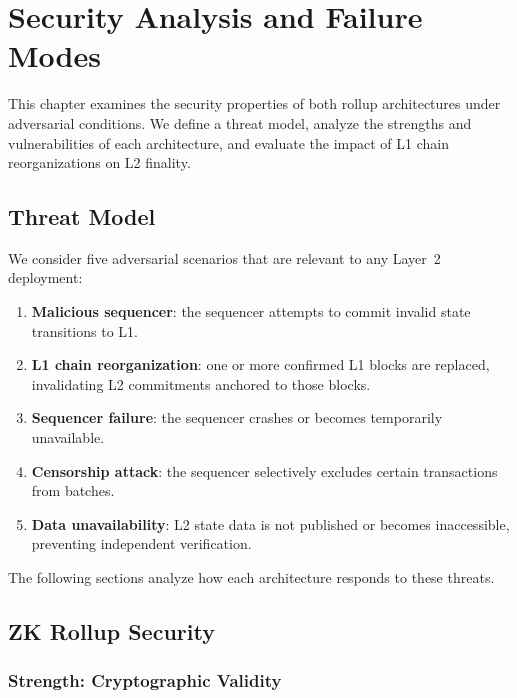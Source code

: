 \chapter{Security Analysis and Failure Modes}
\label{ch:security}

This chapter examines the security properties of both rollup architectures under adversarial conditions. We define a threat model, analyze the strengths and vulnerabilities of each architecture, and evaluate the impact of L1 chain reorganizations on L2 finality.

\section{Threat Model}

We consider five adversarial scenarios that are relevant to any Layer~2 deployment:

\begin{enumerate}
    \item \textbf{Malicious sequencer}: the sequencer attempts to commit invalid state transitions to L1.
    \item \textbf{L1 chain reorganization}: one or more confirmed L1 blocks are replaced, invalidating L2 commitments anchored to those blocks.
    \item \textbf{Sequencer failure}: the sequencer crashes or becomes temporarily unavailable.
    \item \textbf{Censorship attack}: the sequencer selectively excludes certain transactions from batches.
    \item \textbf{Data unavailability}: L2 state data is not published or becomes inaccessible, preventing independent verification.
\end{enumerate}

The following sections analyze how each architecture responds to these threats.

\section{ZK Rollup Security}

\subsection{Strength: Cryptographic Validity}

